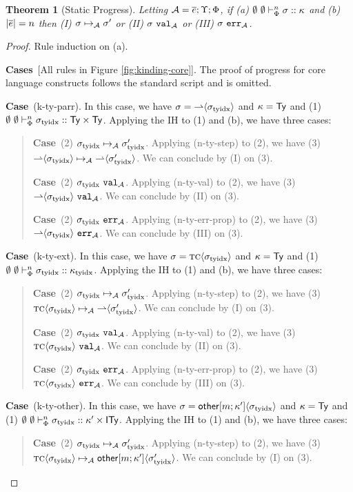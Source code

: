 \documentclass[12pt]{article}
\newtheorem{theorem}{Theorem}
\newcommand{\pfcase}[1]{\textbf{Case}~#1. }
\newcommand{\pfcases}[1]{\textbf{Cases}~#1. }
\begin{document}
\begin{theorem}[Static Progress]\label{thm:static-progress}
Letting $\mathcal{A}=\overline{e};\Upsilon;\Phi$, if (a) $\emptyset~\emptyset \vdash_{\Phi}^{n} \sigma :: \kappa$ and (b) $|\overline{e}|=n$  then (I) $\sigma \mapsto_{\mathcal{A}} \sigma'$ or (II) $\sigma~\mathtt{val}_{\mathcal{A}}$ or (III) $\sigma~\mathtt{err}_{\mathcal{A}}$.
\end{theorem}
\begin{proof} Rule induction on (a).

\pfcases{[All rules in Figure \ref{fig:kinding-core}]} The proof of progress for core language constructs follows the standard script \cite{pfpl} and is omitted.

\pfcase{(k-ty-parr)} In this case, we have $\sigma={\rightharpoonup}\langle\sigma_\text{tyidx}\rangle$ and $\kappa={\sf Ty}$ and (1) $\emptyset~\emptyset \vdash_{\Phi}^{n} \sigma_\text{tyidx} :: {\sf Ty}\times{\sf Ty}$. Applying the IH to (1) and (b), we have three cases:
\begin{quote}
    \pfcase{(2) $\sigma_\text{tyidx} \mapsto_{\mathcal{A}} \sigma_\text{tyidx}'$} Applying (n-ty-step) to (2), we have (3) ${\rightharpoonup}\langle\sigma_\text{tyidx}\rangle \mapsto_{\mathcal{A}} {\rightharpoonup}\langle\sigma_\text{tyidx}'\rangle$. We can conclude by (I) on (3).

    \pfcase{(2) $\sigma_\text{tyidx}~\mathtt{val}_{\mathcal{A}}$} Applying (n-ty-val) to (2), we have (3) ${\rightharpoonup}\langle\sigma_\text{tyidx}\rangle~\mathtt{val}_{\mathcal{A}}$. We can conclude by (II) on (3).

    \pfcase{(2) $\sigma_\text{tyidx}~\mathtt{err}_{\mathcal{A}}$} Applying (n-ty-err-prop) to (2), we have (3) ${\rightharpoonup}\langle\sigma_\text{tyidx}\rangle~\mathtt{err}_{\mathcal{A}}$. We can conclude by (III) on (3).
\end{quote}

\pfcase{(k-ty-ext)} In this case, we have $\sigma={\textsc{tc}}\langle\sigma_\text{tyidx}\rangle$ and $\kappa={\sf Ty}$  and (1) $\emptyset~\emptyset \vdash_{\Phi}^{n} \sigma_\text{tyidx} :: \kappa_\text{tyidx}$. Applying the IH to (1) and (b), we have three cases:
\begin{quote}
    \pfcase{(2) $\sigma_\text{tyidx} \mapsto_{\mathcal{A}} \sigma_\text{tyidx}'$} Applying (n-ty-step) to (2), we have (3) ${\textsc{tc}}\langle\sigma_\text{tyidx}\rangle \mapsto_{\mathcal{A}} {\rightharpoonup}\langle\sigma_\text{tyidx}'\rangle$. We can conclude by (I) on (3).

    \pfcase{(2) $\sigma_\text{tyidx}~\mathtt{val}_{\mathcal{A}}$} Applying (n-ty-val) to (2), we have (3) ${\textsc{tc}}\langle\sigma_\text{tyidx}\rangle~\mathtt{val}_{\mathcal{A}}$. We can conclude by (II) on (3).

    \pfcase{(2) $\sigma_\text{tyidx}~\mathtt{err}_{\mathcal{A}}$} Applying (n-ty-err-prop) to (2), we have (3) ${\textsc{tc}}\langle\sigma_\text{tyidx}\rangle~\mathtt{err}_{\mathcal{A}}$. We can conclude by (III) on (3).
\end{quote}

\pfcase{(k-ty-other)} In this case, we have $\sigma={{\sf other}[m; \kappa']}\langle\sigma_\text{tyidx}\rangle$ and $\kappa={\sf Ty}$ and (1) $\emptyset~\emptyset \vdash_{\Phi}^{n} \sigma_\text{tyidx} :: \kappa'\times{\sf ITy}$. Applying the IH to (1) and (b), we have three cases:
\begin{quote}
    \pfcase{(2) $\sigma_\text{tyidx} \mapsto_{\mathcal{A}} \sigma_\text{tyidx}'$} Applying (n-ty-step) to (2), we have (3) ${\textsc{tc}}\langle\sigma_\text{tyidx}\rangle \mapsto_{\mathcal{A}} {{\sf other}[m; \kappa']}\langle\sigma_\text{tyidx}'\rangle$. We can conclude by (I) on (3).


\end{quote}
\end{proof}
\end{document}
